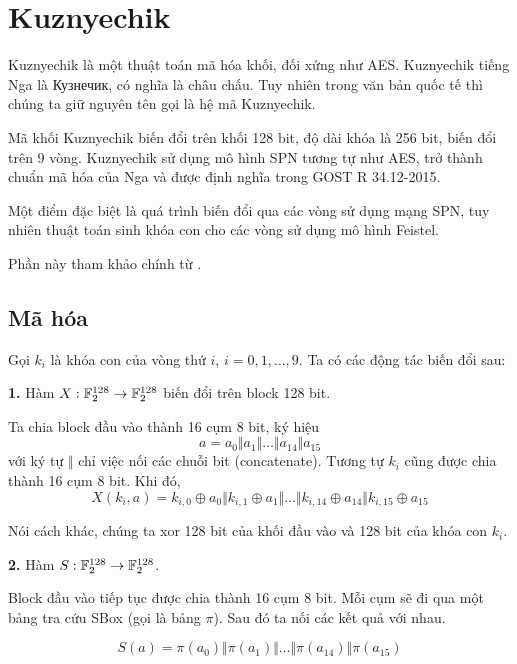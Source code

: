 \chapter{Kuznyechik}

Kuznyechik là một thuật toán mã hóa khối, đối xứng như AES. Kuznyechik
tiếng Nga là \foreignlanguage{russian}{Кузнечик}, có nghĩa là châu chấu.
Tuy nhiên trong văn bản quốc tế thì chúng ta giữ nguyên tên gọi
là hệ mã Kuznyechik.

Mã khối Kuznyechik biến đổi trên khối 128 bit, độ dài khóa là
256 bit, biến đổi trên 9 vòng. Kuznyechik sử dụng mô hình SPN
tương tự như AES, trở thành chuẩn mã hóa của Nga và được định 
nghĩa trong GOST R 34.12-2015.

Một điểm đặc biệt là quá trình biến đổi qua các vòng sử dụng mạng
SPN, tuy nhiên thuật toán sinh khóa con cho các vòng sử dụng
mô hình Feistel.

Phần này tham khảo chính từ \cite{Losi}.

\section{Mã hóa}

Gọi $k_i$ là khóa con của vòng thứ $i$, $i = 0, 1, \ldots, 9$. 
Ta có các động tác biến đổi sau:

\textbf{1.} Hàm $X: \mathbb{F}_2^{128} \to \mathbb{F}_2^{128}$ biến đổi
trên block 128 bit.

Ta chia block đầu vào thành 16 cụm 8 bit, ký hiệu
\[a = a_0 \Vert a_1 \Vert \ldots \Vert a_{14} \Vert a_{15}\]
với ký tự $\Vert$ chỉ việc nối các chuỗi bit (concatenate).
Tương tự $k_i$ cũng được chia thành 16 cụm 8 bit. Khi đó, 
\begin{equation}
    \label{kuz:1}
    X(k_i, a) = k_{i, 0} \oplus a_0 \Vert 
    k_{i, 1} \oplus a_1 \Vert \ldots \Vert k_{i, 14} \oplus a_{14}
    \Vert k_{i, 15} \oplus a_{15}
\end{equation}

Nói cách khác, chúng ta xor 128 bit của khối đầu vào và 128 bit của
khóa con $k_i$.

\textbf{2.} Hàm $S: \mathbb{F}_2^{128} \to \mathbb{F}_2^{128}$.

Block đầu vào tiếp tục được chia thành 16 cụm 8 bit. Mỗi cụm
sẽ đi qua một bảng tra cứu SBox (gọi là bảng $\pi$). Sau đó
ta nối các kết quả với nhau.

\begin{equation}
    \label{kuz:2}
    S(a) = \pi(a_0) \Vert \pi(a_1) \Vert \ldots \Vert \pi(a_{14})
    \Vert \pi(a_{15})
\end{equation}

